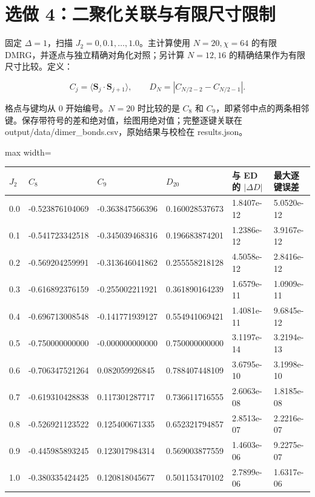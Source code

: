\documentclass[zihao=5,a4paper]{ctexart}
\begin{document}
\section{选做 4：二聚化关联与有限尺寸限制}

固定 $\Delta=1$，扫描 $J_2=0,0.1,\ldots,1.0$。主计算使用 $N=20,\chi=64$ 的有限 DMRG，并逐点与独立精确对角化对照；另计算 $N=12,16$ 的精确结果作为有限尺寸比较。定义：


\[
C_j=\langle\mathbf S_j\cdot\mathbf S_{j+1}\rangle,\qquad D_N=\left|C_{N/2-2}-C_{N/2-1}\right|.
\]

格点与键均从 0 开始编号。$N=20$ 时比较的是 $C_8$ 和 $C_9$，即紧邻中点的两条相邻键。保存带符号的差和绝对值，绘图用绝对值；完整逐键关联在 output/data/dimer\_bonds.csv，原始结果与校检在 results.json。


\begin{center}
\small
\begin{adjustbox}{max width=\linewidth}
\begin{tabular}{llllll}
\toprule
$J_2$ & $C_8$ & $C_9$ & $D_{20}$ & 与 ED 的 $|\Delta D|$ & 最大逐键误差 \\
\midrule
0.0 & -0.523876104069 & -0.363847566396 & 0.160028537673 & 1.8407e-12 & 5.0520e-12 \\
0.1 & -0.541723342518 & -0.345039468316 & 0.196683874201 & 1.2386e-12 & 3.9167e-12 \\
0.2 & -0.569204259991 & -0.313646041862 & 0.255558218128 & 4.5058e-12 & 2.8416e-12 \\
0.3 & -0.616892376159 & -0.255002211921 & 0.361890164239 & 1.6579e-11 & 1.0909e-11 \\
0.4 & -0.696713008548 & -0.141771939127 & 0.554941069421 & 1.4081e-11 & 9.6845e-12 \\
0.5 & -0.750000000000 & -0.000000000000 & 0.750000000000 & 3.1197e-14 & 3.2194e-13 \\
0.6 & -0.706347521264 & 0.082059926845 & 0.788407448109 & 3.6795e-10 & 3.1998e-10 \\
0.7 & -0.619310428838 & 0.117301287717 & 0.736611716555 & 2.6063e-08 & 1.8185e-08 \\
0.8 & -0.526921123522 & 0.125400671335 & 0.652321794857 & 2.8513e-07 & 2.2216e-07 \\
0.9 & -0.445985893245 & 0.123017984314 & 0.569003877559 & 1.4603e-06 & 9.2275e-07 \\
1.0 & -0.380335424425 & 0.120818045677 & 0.501153470102 & 2.7899e-06 & 1.6317e-06 \\
\bottomrule
\end{tabular}
\end{adjustbox}
\end{center}
\end{document}
